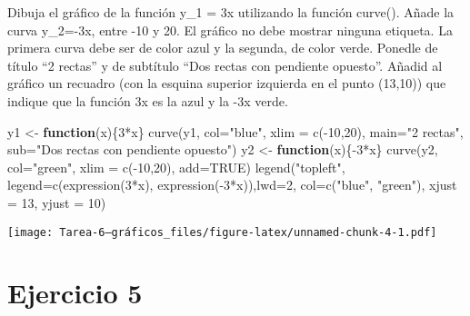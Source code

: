 \documentclass[
]{article}
\newenvironment{Shaded}{\begin{snugshade}}{\end{snugshade}}
\newcommand{\AttributeTok}[1]{\textcolor[rgb]{0.77,0.63,0.00}{#1}}
\newcommand{\ConstantTok}[1]{\textcolor[rgb]{0.00,0.00,0.00}{#1}}
\newcommand{\ControlFlowTok}[1]{\textcolor[rgb]{0.13,0.29,0.53}{\textbf{#1}}}
\newcommand{\DecValTok}[1]{\textcolor[rgb]{0.00,0.00,0.81}{#1}}
\newcommand{\FunctionTok}[1]{\textcolor[rgb]{0.00,0.00,0.00}{#1}}
\newcommand{\NormalTok}[1]{#1}
\newcommand{\OtherTok}[1]{\textcolor[rgb]{0.56,0.35,0.01}{#1}}
\newcommand{\SpecialCharTok}[1]{\textcolor[rgb]{0.00,0.00,0.00}{#1}}
\newcommand{\StringTok}[1]{\textcolor[rgb]{0.31,0.60,0.02}{#1}}
\begin{document}
Dibuja el gráfico de la función y\_1 = 3x utilizando la función curve().
Añade la curva y\_2=-3x, entre -10 y 20. El gráfico no debe mostrar
ninguna etiqueta. La primera curva debe ser de color azul y la segunda,
de color verde. Ponedle de título ``2 rectas'' y de subtítulo ``Dos
rectas con pendiente opuesto''. Añadid al gráfico un recuadro (con la
esquina superior izquierda en el punto (13,10)) que indique que la
función 3x es la azul y la -3x verde.

\begin{Shaded}
\begin{Highlighting}[]
\NormalTok{y1 }\OtherTok{\textless{}{-}} \ControlFlowTok{function}\NormalTok{(x)\{}\DecValTok{3}\SpecialCharTok{*}\NormalTok{x\}}
\FunctionTok{curve}\NormalTok{(y1, }\AttributeTok{col=}\StringTok{"blue"}\NormalTok{, }\AttributeTok{xlim =} \FunctionTok{c}\NormalTok{(}\SpecialCharTok{{-}}\DecValTok{10}\NormalTok{,}\DecValTok{20}\NormalTok{), }\AttributeTok{main=}\StringTok{"2 rectas"}\NormalTok{, }\AttributeTok{sub=}\StringTok{"Dos rectas con pendiente opuesto"}\NormalTok{)}
\NormalTok{y2 }\OtherTok{\textless{}{-}} \ControlFlowTok{function}\NormalTok{(x)\{}\SpecialCharTok{{-}}\DecValTok{3}\SpecialCharTok{*}\NormalTok{x\}}
\FunctionTok{curve}\NormalTok{(y2, }\AttributeTok{col=}\StringTok{"green"}\NormalTok{, }\AttributeTok{xlim =} \FunctionTok{c}\NormalTok{(}\SpecialCharTok{{-}}\DecValTok{10}\NormalTok{,}\DecValTok{20}\NormalTok{), }\AttributeTok{add=}\ConstantTok{TRUE}\NormalTok{)}
\FunctionTok{legend}\NormalTok{(}\StringTok{"topleft"}\NormalTok{, }\AttributeTok{legend=}\FunctionTok{c}\NormalTok{(}\FunctionTok{expression}\NormalTok{(}\DecValTok{3}\SpecialCharTok{*}\NormalTok{x), }\FunctionTok{expression}\NormalTok{(}\SpecialCharTok{{-}}\DecValTok{3}\SpecialCharTok{*}\NormalTok{x)),}\AttributeTok{lwd=}\DecValTok{2}\NormalTok{, }\AttributeTok{col=}\FunctionTok{c}\NormalTok{(}\StringTok{"blue"}\NormalTok{, }\StringTok{"green"}\NormalTok{), }\AttributeTok{xjust =} \DecValTok{13}\NormalTok{, }\AttributeTok{yjust =} \DecValTok{10}\NormalTok{)}
\end{Highlighting}
\end{Shaded}

\texttt{[image: Tarea-6--gráficos\_files/figure-latex/unnamed-chunk-4-1.pdf]}

\hypertarget{ejercicio-5}{%
\section{Ejercicio 5}\label{ejercicio-5}}
\end{document}
